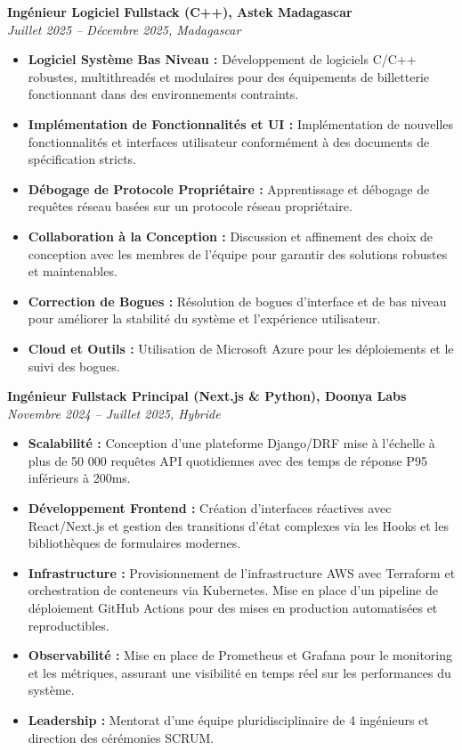 \documentclass[a4paper,10pt]{article}
\newcommand{\jobheader}[4]{%
    \textbf{#1, #2} \\
    \textit{#3, #4}
    \vspace{0.05cm}
}
\begin{document}
\jobheader{Ingénieur Logiciel Fullstack (C++)}{Astek Madagascar}{Juillet 2025 -- Décembre 2025}{Madagascar}
\begin{itemize}[leftmargin=*,nosep]
    \item \textbf{Logiciel Système Bas Niveau :} Développement de logiciels C/C++ robustes, multithreadés et modulaires pour des équipements de billetterie fonctionnant dans des environnements contraints.
    \item \textbf{Implémentation de Fonctionnalités et UI :} Implémentation de nouvelles fonctionnalités et interfaces utilisateur conformément à des documents de spécification stricts.
    \item \textbf{Débogage de Protocole Propriétaire :} Apprentissage et débogage de requêtes réseau basées sur un protocole réseau propriétaire.
    \item \textbf{Collaboration à la Conception :} Discussion et affinement des choix de conception avec les membres de l'équipe pour garantir des solutions robustes et maintenables.
    \item \textbf{Correction de Bogues :} Résolution de bogues d'interface et de bas niveau pour améliorer la stabilité du système et l'expérience utilisateur.
    \item \textbf{Cloud et Outils :} Utilisation de Microsoft Azure pour les déploiements et le suivi des bogues.
\end{itemize}

\vspace{0.15cm}

\jobheader{Ingénieur Fullstack Principal (Next.js \& Python)}{Doonya Labs}{Novembre 2024 -- Juillet 2025}{Hybride}
\begin{itemize}[leftmargin=*,nosep]
    \item \textbf{Scalabilité :} Conception d'une plateforme Django/DRF mise à l'échelle à plus de 50 000 requêtes API quotidiennes avec des temps de réponse P95 inférieurs à 200ms.
    \item \textbf{Développement Frontend :} Création d'interfaces réactives avec React/Next.js et gestion des transitions d'état complexes via les Hooks et les bibliothèques de formulaires modernes.
    \item \textbf{Infrastructure :} Provisionnement de l'infrastructure AWS avec Terraform et orchestration de conteneurs via Kubernetes. Mise en place d'un pipeline de déploiement GitHub Actions pour des mises en production automatisées et reproductibles.
    \item \textbf{Observabilité :} Mise en place de Prometheus et Grafana pour le monitoring et les métriques, assurant une visibilité en temps réel sur les performances du système.
    \item \textbf{Leadership :} Mentorat d'une équipe pluridisciplinaire de 4 ingénieurs et direction des cérémonies SCRUM.
\end{itemize}
\end{document}
